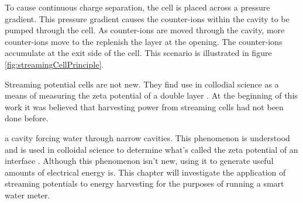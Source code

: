 


    To cause continuous charge separation, the cell is placed across a pressure gradient.
    This pressure gradient causes the counter-ions within the cavity to be pumped through the cell.
    As counter-ions are moved through the cavity, more counter-ions move to the replenish the layer at the opening.
    The counter-ions accumulate at the exit side of the cell.
    This scenario is illustrated in figure \ref{fig:streamingCellPrinciple}.

    Streaming potential cells are not new.
    They find use in collodial science as a means of measuring the zeta potential of a double layer \cite{Gu2000,Scales1992,Daiguji2004,VanderHeyden2006,Mala1997}.
    At the beginning of this work it was believed that harvesting power from streaming cells had not been done before.




    a cavity forcing water through narrow cavities. This phenomenon is understood
    and is used in colloidal science to determine what's called the zeta potential
    of an interface \cite{Gu2000,Scales1992,Daiguji2004,VanderHeyden2006,Mala1997}.
    Although this phenomenon isn't new, using it to generate useful amounts of
    electrical energy is. This chapter will investigate the application of
    streaming potentials to energy harvesting for the purposes of running a smart
    water meter.



